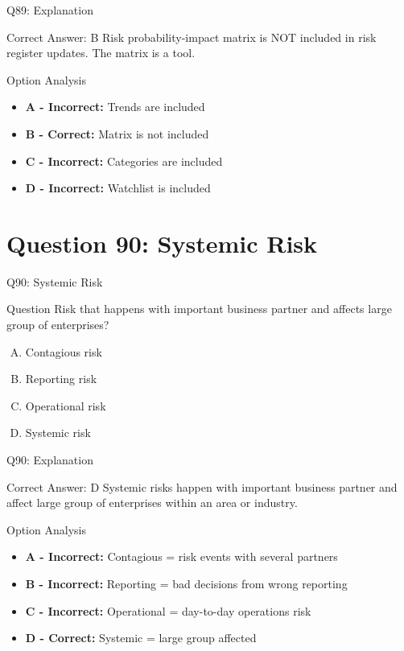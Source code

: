 \documentclass{beamer}
\begin{document}
	\begin{frame}{Q89: Explanation}
		\begin{block}{Correct Answer: B}
			Risk probability-impact matrix is NOT included in risk register updates. The matrix is a tool.
		\end{block}
		\begin{block}{Option Analysis}
			\begin{itemize}
				\item \textbf{A - Incorrect:} Trends are included
				\item \textbf{B - Correct:} Matrix is not included
				\item \textbf{C - Incorrect:} Categories are included
				\item \textbf{D - Incorrect:} Watchlist is included
			\end{itemize}
		\end{block}
	\end{frame}
	
	\section{Question 90: Systemic Risk}
	
	\begin{frame}{Q90: Systemic Risk}
		\begin{block}{Question}
			Risk that happens with important business partner and affects large group of enterprises?
		\end{block}
		\begin{enumerate}[(A)]
			\item Contagious risk
			\item Reporting risk
			\item Operational risk
			\item Systemic risk
		\end{enumerate}
	\end{frame}
	
	\begin{frame}{Q90: Explanation}
		\begin{block}{Correct Answer: D}
			Systemic risks happen with important business partner and affect large group of enterprises within an area or industry.
		\end{block}
		\begin{block}{Option Analysis}
			\begin{itemize}
				\item \textbf{A - Incorrect:} Contagious = risk events with several partners
				\item \textbf{B - Incorrect:} Reporting = bad decisions from wrong reporting
				\item \textbf{C - Incorrect:} Operational = day-to-day operations risk
				\item \textbf{D - Correct:} Systemic = large group affected
			\end{itemize}
		\end{block}
	\end{frame}
	
\end{document}
